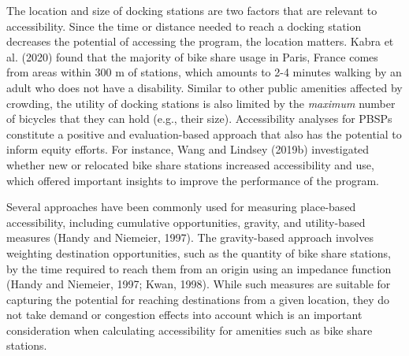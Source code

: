 \documentclass[]{elsarticle} %
\begin{document}
The location and size of docking stations are two factors that are
relevant to accessibility. Since the time or distance needed to reach a
docking station decreases the potential of accessing the program, the
location matters. Kabra et al. (2020) found that the majority of bike
share usage in Paris, France comes from areas within 300 m of stations,
which amounts to 2-4 minutes walking by an adult who does not have a
disability. Similar to other public amenities affected by crowding, the
utility of docking stations is also limited by the \emph{maximum} number
of bicycles that they can hold (e.g., their size). Accessibility
analyses for PBSPs constitute a positive and evaluation-based approach
that also has the potential to inform equity efforts. For instance, Wang
and Lindsey (2019b) investigated whether new or relocated bike share
stations increased accessibility and use, which offered important
insights to improve the performance of the program.

Several approaches have been commonly used for measuring place-based
accessibility, including cumulative opportunities, gravity, and
utility-based measures (Handy and Niemeier, 1997). The gravity-based
approach involves weighting destination opportunities, such as the
quantity of bike share stations, by the time required to reach them from
an origin using an impedance function (Handy and Niemeier, 1997; Kwan,
1998). While such measures are suitable for capturing the potential for
reaching destinations from a given location, they do not take demand or
congestion effects into account which is an important consideration when
calculating accessibility for amenities such as bike share stations.
\end{document}
